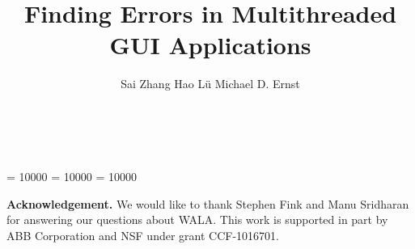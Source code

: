\documentclass{sig-alternate-issta}
\begin{document}
\clubpenalty = 10000
\widowpenalty = 10000
\displaywidowpenalty = 10000


\title{Finding Errors in Multithreaded GUI Applications}

\author{
\alignauthor Sai Zhang \quad Hao L\"u \quad Michael D. Ernst\\
       \\
       \\
}


\maketitle
\thispagestyle{empty}
\pagestyle{empty}
















\vspace{2mm}

\noindent \textbf{Acknowledgement.} We would like
to thank Stephen Fink and Manu Sridharan for
answering our questions about WALA. This work is supported in part by ABB Corporation and NSF under grant CCF-1016701.
\vspace{-2mm}

\balance



\end{document}
